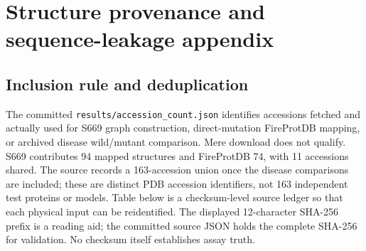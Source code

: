 \clearpage
\section{Structure provenance and sequence-leakage appendix}
\subsection{Inclusion rule and deduplication}
The committed \texttt{results/accession\_count.json} identifies accessions fetched and actually used for S669 graph construction, direct-mutation FireProtDB mapping, or archived disease wild/mutant comparison. Mere download does not qualify. S669 contributes 94 mapped structures and FireProtDB 74, with 11 accessions shared. The source records a 163-accession union once the disease comparisons are included; these are distinct PDB accession identifiers, not 163 independent test proteins or models. Table below is a checksum-level source ledger so that each physical input can be reidentified. The displayed 12-character SHA-256 prefix is a reading aid; the committed source JSON holds the complete SHA-256 for validation. No checksum itself establishes assay truth.

